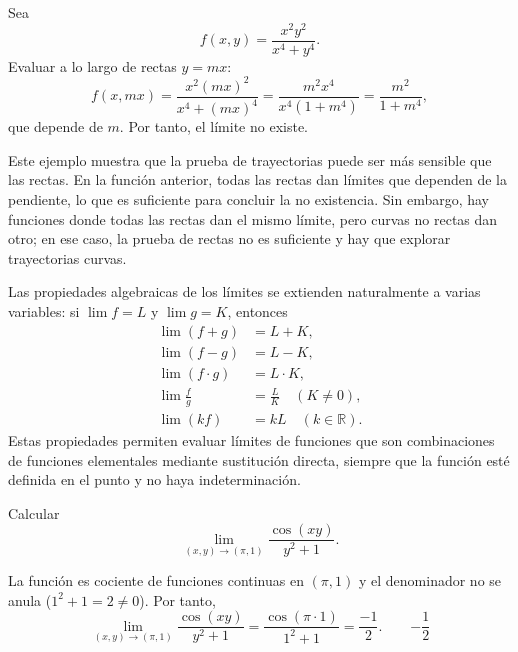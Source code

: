 \begin{example}
Sea
\[
f(x,y) = \frac{x^2 y^2}{x^4 + y^4}.
\]
Evaluar a lo largo de rectas $y=mx$:
\[
f(x,mx) = \frac{x^2(mx)^2}{x^4+(mx)^4}
        = \frac{m^2 x^4}{x^4(1+m^4)}
        = \frac{m^2}{1+m^4},
\]
que depende de $m$. Por tanto, el límite no existe.
\end{example}

\begin{rem}
Este ejemplo muestra que la prueba de trayectorias puede ser más
sensible que las rectas. En la función anterior, todas las rectas dan
límites que dependen de la pendiente, lo que es suficiente para
concluir la no existencia. Sin embargo, hay funciones donde todas las
rectas dan el mismo límite, pero curvas no rectas dan otro; en ese
caso, la prueba de rectas no es suficiente y hay que explorar
trayectorias curvas.
\end{rem}


Las propiedades algebraicas de los límites se extienden naturalmente a
varias variables: si $\lim f=L$ y $\lim g=K$, entonces
\[
\begin{aligned}
\lim (f+g) &= L+K,\\
\lim (f-g) &= L-K,\\
\lim (f\cdot g) &= L\cdot K,\\
\lim \frac{f}{g} &= \frac{L}{K} \quad (K\neq 0),\\
\lim (k f) &= kL \quad (k\in\mathbb{R}).
\end{aligned}
\]
Estas propiedades permiten evaluar límites de funciones que son
combinaciones de funciones elementales mediante sustitución directa,
siempre que la función esté definida en el punto y no haya
indeterminación.

\begin{example}
Calcular
\[
\lim_{(x,y)\to(\pi,1)} \frac{\cos(xy)}{y^2+1}.
\]
\end{example}

\begin{myproof}
La función es cociente de funciones continuas en $(\pi,1)$ y el
denominador no se anula ($1^2+1=2\neq 0$). Por tanto,
\[
\lim_{(x,y)\to(\pi,1)} \frac{\cos(xy)}{y^2+1}
= \frac{\cos(\pi\cdot 1)}{1^2+1}
= \frac{-1}{2}.
\qquad\boxed{-\frac12}
\]
\end{myproof}

